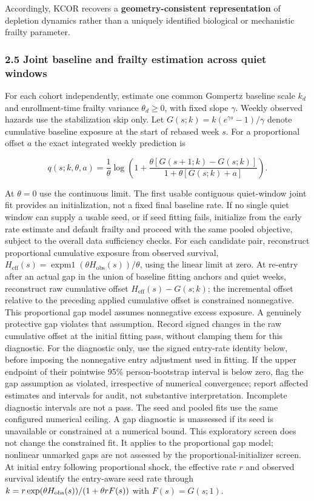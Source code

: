 \documentclass[
]{article}
\begin{document}
Accordingly, KCOR recovers a \textbf{geometry-consistent representation} of depletion dynamics rather than a uniquely identified biological or mechanistic frailty parameter.

\subsubsection{2.5 Joint baseline and frailty estimation across quiet windows}\label{joint-baseline-and-frailty-estimation-across-quiet-windows}

For each cohort independently, estimate one common Gompertz baseline scale \(k_d\) and enrollment-time frailty variance \(\theta_d\ge0\), with fixed slope \(\gamma\). Weekly observed hazards use the stabilization skip only. Let \(G(s;k)=k(e^{\gamma s}-1)/\gamma\) denote cumulative baseline exposure at the start of rebased week \(s\). For a proportional offset \(a\) the exact integrated weekly prediction is

\[q(s;k,\theta,a)=\frac{1}{\theta}\log\left(1+\frac{\theta[G(s+1;k)-G(s;k)]}{1+\theta[G(s;k)+a]}\right).\]

At \(\theta=0\) use the continuous limit. The first usable contiguous quiet-window joint fit provides an initialization, not a fixed final baseline rate. If no single quiet window can supply a usable seed, or if seed fitting fails, initialize from the early rate estimate and default frailty and proceed with the same pooled objective, subject to the overall data sufficiency checks. For each candidate pair, reconstruct proportional cumulative exposure from observed survival, \(H_{\mathrm{eff}}(s)=\operatorname{expm1}(\theta H_{\mathrm{obs}}(s))/\theta\), using the linear limit at zero. At re-entry after an actual gap in the union of baseline fitting anchors and quiet weeks, reconstruct raw cumulative offset \(H_{\mathrm{eff}}(s)-G(s;k)\); the incremental offset relative to the preceding applied cumulative offset is constrained nonnegative. This proportional gap model assumes nonnegative excess exposure. A genuinely protective gap violates that assumption. Record signed changes in the raw cumulative offset at the initial fitting pass, without clamping them for this diagnostic. For the diagnostic only, use the signed entry-rate identity below, before imposing the nonnegative entry adjustment used in fitting. If the upper endpoint of their pointwise 95\% person-bootstrap interval is below zero, flag the gap assumption as violated, irrespective of numerical convergence; report affected estimates and intervals for audit, not substantive interpretation. Incomplete diagnostic intervals are not a pass. The seed and pooled fits use the same configured numerical ceiling. A gap diagnostic is unassessed if its seed is unavailable or constrained at a numerical bound. This exploratory screen does not change the constrained fit. It applies to the proportional gap model; nonlinear unmarked gaps are not assessed by the proportional-initializer screen. At initial entry following proportional shock, the effective rate \(r\) and observed survival identify the entry-aware seed rate through \(k=r\exp(\theta H_{\rm obs}(s))/(1+\theta r F(s))\) with \(F(s)=G(s;1)\).
\end{document}
